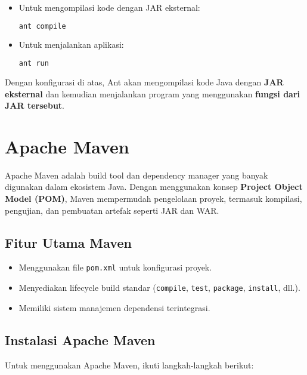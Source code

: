 \begin{itemize}
	\item Untuk mengompilasi kode dengan JAR eksternal:
	\begin{lstlisting}[language=bash]
		ant compile
	\end{lstlisting}
	\item Untuk menjalankan aplikasi:
	\begin{lstlisting}[language=bash]
		ant run
	\end{lstlisting}
\end{itemize}

Dengan konfigurasi di atas, Ant akan mengompilasi kode Java dengan \textbf{JAR eksternal} dan kemudian menjalankan program yang menggunakan \textbf{fungsi dari JAR tersebut}.


\section{Apache Maven}
Apache Maven adalah build tool dan dependency manager yang banyak digunakan dalam ekosistem Java. Dengan menggunakan konsep \textbf{Project Object Model (POM)}, Maven mempermudah pengelolaan proyek, termasuk kompilasi, pengujian, dan pembuatan artefak seperti JAR dan WAR.

\subsection{Fitur Utama Maven}
\begin{itemize}
	\item Menggunakan file \texttt{pom.xml} untuk konfigurasi proyek.
	\item Menyediakan lifecycle build standar (\texttt{compile}, \texttt{test}, \texttt{package}, \texttt{install}, dll.).
	\item Memiliki sistem manajemen dependensi terintegrasi.
\end{itemize}

\subsection{Instalasi Apache Maven}
Untuk menggunakan Apache Maven, ikuti langkah-langkah berikut:

